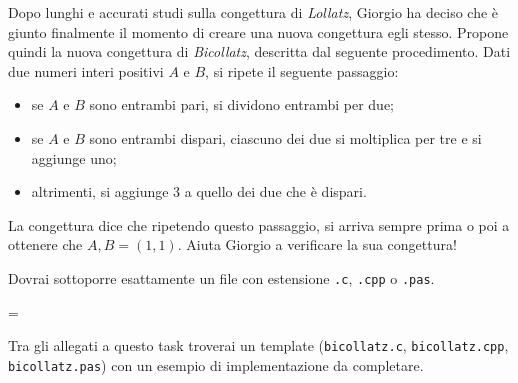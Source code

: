 \usepackage{xcolor}
\usepackage{afterpage}
\usepackage{pifont,mdframed}
\usepackage[bottom]{footmisc}

\makeatletter
\gdef\this@inputfilename{input.txt}
\gdef\this@outputfilename{output.txt}
\makeatother

\newcommand{\inputfile}{\texttt{input.txt}}
\newcommand{\outputfile}{\texttt{output.txt}}

\newenvironment{warning}
  {\par\begin{mdframed}[linewidth=2pt,linecolor=gray]%
    \begin{list}{}{\leftmargin=1cm
                   \labelwidth=\leftmargin}\item[\Large\ding{43}]}
  {\end{list}\end{mdframed}\par}

	Dopo lunghi e accurati studi sulla congettura di \emph{Lollatz}, Giorgio ha deciso che è giunto finalmente il momento di creare una nuova congettura egli stesso. Propone quindi la nuova congettura di \emph{Bicollatz}, descritta dal seguente procedimento. Dati due numeri interi positivi $A$ e $B$, si ripete il seguente passaggio:
	\begin{itemize}
		\item se $A$ e $B$ sono entrambi pari, si dividono entrambi per due;
		\item se $A$ e $B$ sono entrambi dispari, ciascuno dei due si moltiplica per tre e si aggiunge uno;
		\item altrimenti, si aggiunge $3$ a quello dei due che è dispari.
	\end{itemize}
	La congettura dice che ripetendo questo passaggio, si arriva sempre prima o poi a ottenere che $A,B = (1,1)$. Aiuta Giorgio a verificare la sua congettura!

\Implementation
Dovrai sottoporre esattamente un file con estensione \texttt{.c}, \texttt{.cpp} o \texttt{.pas}.

\begin{warning}
Tra gli allegati a questo task troverai un template (\texttt{bicollatz.c}, \texttt{bicollatz.cpp}, \texttt{bicollatz.pas}) con un esempio di implementazione da completare.
\end{warning}

